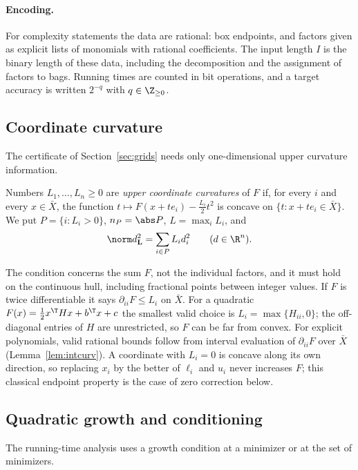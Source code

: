 \paragraph{Encoding.}
For complexity statements the data are rational: box endpoints, and factors
given as explicit lists of monomials with rational coefficients. The input
length $I$ is the binary length of these data, including the decomposition
and the assignment of factors to bags. Running times are counted in bit
operations, and a target accuracy is written $2^{-q}$ with $q\in\Z_{\ge0}$.

\subsection{Coordinate curvature}
The certificate of Section~\ref{sec:grids} needs only one-dimensional upper
curvature information.

\begin{definition}\label{def:curvature}
Numbers $L_1,\dots,L_n\ge0$ are \emph{upper coordinate curvatures} of $F$ if,
for every $i$ and every $x\in\bar X$, the function
$t\mapsto F(x+te_i)-\frac{L_i}{2}t^2$ is concave on
$\{t:x+te_i\in\bar X\}$. We put $P=\{i:L_i>0\}$, $n_P=\abs P$, $L=\max_iL_i$,
and
\[
\norm d_{\mathbf L}^2=\sum_{i\in P}L_id_i^2\qquad(d\in\R^n).
\]
\end{definition}

The condition concerns the sum $F$, not the individual factors, and it must
hold on the continuous hull, including fractional points between integer
values. If $F$ is twice differentiable it says $\partial_{ii}F\le L_i$ on
$\bar X$. For a quadratic $F(x)=\frac12x^\T Hx+b^\T x+c$ the smallest valid
choice is $L_i=\max\{H_{ii},0\}$; the off-diagonal entries of $H$ are
unrestricted, so $F$ can be far from convex. For explicit polynomials, valid
rational bounds follow from interval evaluation of $\partial_{ii}F$ over $\bar X$
(Lemma~\ref{lem:intcurv}). A coordinate with $L_i=0$ is concave along its own
direction, so replacing $x_i$ by the better of $\ell_i$ and $u_i$ never
increases $F$; this classical endpoint property
\cite{Rosenberg1972,DelPiaKhajavirad2026} is the case of zero correction
below.

\subsection{Quadratic growth and conditioning}
The running-time analysis uses a growth condition at a minimizer or at the
set of minimizers.

